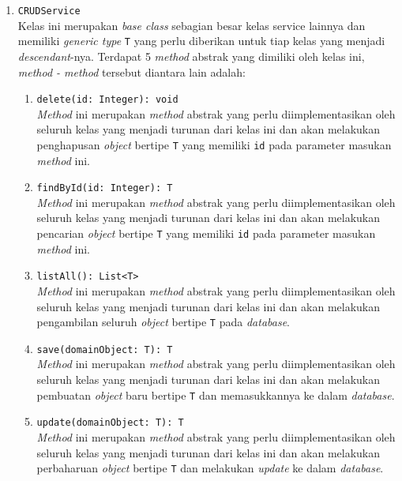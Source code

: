 \begin{enumerate}
	\item \texttt{CRUDService}\\
	Kelas ini merupakan \textit{base class} sebagian besar kelas service lainnya dan memiliki \textit{generic type} \texttt{T} yang perlu diberikan untuk tiap kelas yang menjadi \textit{descendant}-nya. Terdapat 5 \textit{method} abstrak yang dimiliki oleh kelas ini, \textit{method - method} tersebut diantara lain adalah:
	\begin{enumerate}
		\item \texttt{delete(id: Integer): void}\\
		\textit{Method} ini merupakan \textit{method} abstrak yang perlu diimplementasikan oleh seluruh kelas yang menjadi turunan dari kelas ini dan akan melakukan penghapusan \textit{object} bertipe \texttt{T} yang memiliki \texttt{id} pada parameter masukan \textit{method} ini.
		
		\item \texttt{findById(id: Integer): T}\\
		\textit{Method} ini merupakan \textit{method} abstrak yang perlu diimplementasikan oleh seluruh kelas yang menjadi turunan dari kelas ini dan akan melakukan pencarian \textit{object} bertipe \texttt{T} yang memiliki \texttt{id} pada parameter masukan \textit{method} ini.

		\item \texttt{listAll(): List<T>}\\
		\textit{Method} ini merupakan \textit{method} abstrak yang perlu diimplementasikan oleh seluruh kelas yang menjadi turunan dari kelas ini dan akan melakukan pengambilan seluruh \textit{object} bertipe \texttt{T} pada \textit{database}.

		\item \texttt{save(domainObject: T): T}\\
		\textit{Method} ini merupakan \textit{method} abstrak yang perlu diimplementasikan oleh seluruh kelas yang menjadi turunan dari kelas ini dan akan melakukan pembuatan \textit{object} baru bertipe \texttt{T} dan memasukkannya ke dalam \textit{database}.

		\item \texttt{update(domainObject: T): T}\\
		\textit{Method} ini merupakan \textit{method} abstrak yang perlu diimplementasikan oleh seluruh kelas yang menjadi turunan dari kelas ini dan akan melakukan perbaharuan \textit{object} bertipe \texttt{T} dan melakukan \textit{update} ke dalam \textit{database}.
		

\end{enumerate}
\end{enumerate}
